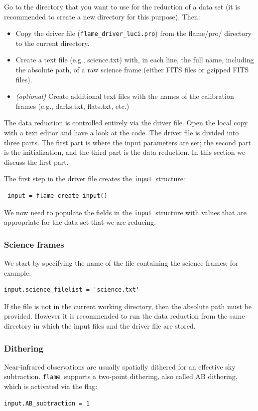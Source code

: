 \documentclass[a4paper, notitlepage]{article}
\newcommand{\flame}{\texttt{flame}}
\newcommand{\inp}{\texttt{input}}
\begin{document}
Go to the directory that you want to use for the reduction of a data set (it is recommended to create a new directory for this purpose). Then:
\begin{itemize}
\item Copy the driver file (\texttt{flame\_driver\_luci.pro}) from the flame/pro/ directory to the current directory.
\item Create a text file (e.g., science.txt) with, in each line, the full name, including the absolute path, of a raw science frame (either FITS files or gzipped FITS files).
\item \emph{(optional)} Create additional text files with the names of the calibration frames (e.g., darks.txt, flats.txt, etc.)
\end{itemize}

The data reduction is controlled entirely via the driver file. Open the local copy with a text editor and have a look at the code. The driver file is divided into three parts. The first part is where the input parameters are set; the second part is the initialization, and the third part is the data reduction. In this section we discuss the first part.

The first step in the driver file creates the \inp\ structure:
\begin{lstlisting}
 input = flame_create_input()
\end{lstlisting}
We now need to populate the fields in the \inp\ structure with values that are appropriate for the data set that we are reducing.

\subsubsection{Science frames}
We start by specifying the name of the file containing the science frames; for example:
\begin{lstlisting}
input.science_filelist = 'science.txt'
\end{lstlisting}
If the file is not in the current working directory, then the absolute path must be provided. However it is recommended to run the data reduction from the same directory in which the input files and the driver file are stored.

\subsubsection{Dithering}
Near-infrared observations are usually spatially dithered for an effective sky subtraction. \flame\ supports a two-point dithering, also called AB dithering, which is activated via the flag:
\begin{lstlisting}
input.AB_subtraction = 1
\end{lstlisting}
\end{document}
